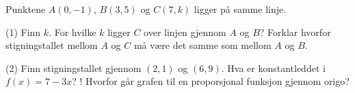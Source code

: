 Punktene $A(0, -1)$, $B(3, 5)$ og $C(7, k)$ ligger på samme linje.
\begin{tasks}(1)
  \task Finn $k$.
  \task For hvilke $k$ ligger $C$ over linjen gjennom $A$ og $B$?
  \task Forklar hvorfor stigningstallet mellom $A$ og $C$ må være det samme som mellom $A$ og $B$.
\end{tasks}

\begin{sjekk}
\begin{tasks}(2)
  \task Finn stigningstallet gjennom $(2, 1)$ og $(6, 9)$.
  \task Hva er konstantleddet i $f(x) = 7 - 3x$?
  \task! Hvorfor går grafen til en proporsjonal funksjon gjennom origo?
\end{tasks}
\end{sjekk}
